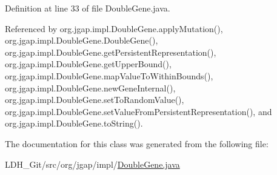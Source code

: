 Definition at line 33 of file Double\-Gene.\-java.



Referenced by org.\-jgap.\-impl.\-Double\-Gene.\-apply\-Mutation(), org.\-jgap.\-impl.\-Double\-Gene.\-Double\-Gene(), org.\-jgap.\-impl.\-Double\-Gene.\-get\-Persistent\-Representation(), org.\-jgap.\-impl.\-Double\-Gene.\-get\-Upper\-Bound(), org.\-jgap.\-impl.\-Double\-Gene.\-map\-Value\-To\-Within\-Bounds(), org.\-jgap.\-impl.\-Double\-Gene.\-new\-Gene\-Internal(), org.\-jgap.\-impl.\-Double\-Gene.\-set\-To\-Random\-Value(), org.\-jgap.\-impl.\-Double\-Gene.\-set\-Value\-From\-Persistent\-Representation(), and org.\-jgap.\-impl.\-Double\-Gene.\-to\-String().



The documentation for this class was generated from the following file\-:\begin{DoxyCompactItemize}
\item 
L\-D\-H\-\_\-\-Git/src/org/jgap/impl/\hyperlink{_double_gene_8java}{Double\-Gene.\-java}\end{DoxyCompactItemize}
